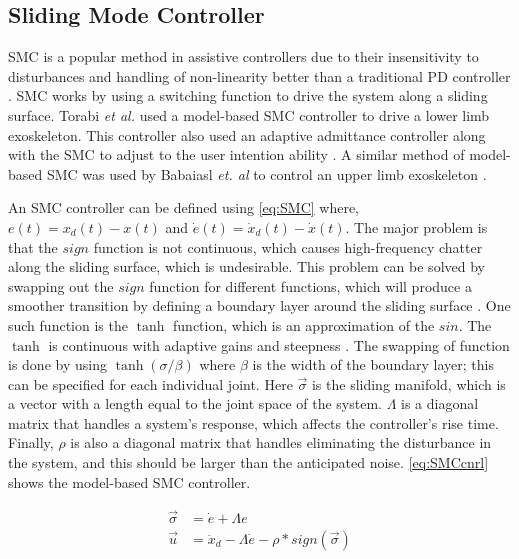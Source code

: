 \subsection{Sliding Mode Controller}

SMC is a popular method in assistive controllers due to their insensitivity to disturbances and handling of non-linearity better than a traditional PD controller \cite{nasir2010performance} \cite{sanngoen2020review} \cite{fischer-SMC}. SMC works by using a switching function to drive the system along a sliding surface. Torabi \textit{et al.} used a model-based SMC controller to drive a lower limb exoskeleton. This controller also used an adaptive admittance controller along with the SMC to adjust to the user intention ability \cite{torabi2018robust}. A similar method of model-based SMC was used by Babaiasl \textit{et. al} to control an upper limb exoskeleton \cite{babaiasl2015sliding}.


An SMC controller can be defined using \autoref{eq:SMC} where, $e(t) = x_d(t) - x(t)$ and $\dot{e}(t) = \dot{x}_d(t) - \dot{x}(t)$. The major problem is that the $sign$ function is not continuous, which causes high-frequency chatter along the sliding surface, which is undesirable. This problem can be solved by swapping out the $sign$  function for different functions, which will produce a smoother transition by defining a boundary layer around the sliding surface \cite{babaiasl2015sliding}. One such function is the $\tanh$ function, which is an approximation of the $sin$. The $\tanh$ is continuous with adaptive gains and steepness \cite{aghababa2012chattering}. The swapping of function is done by using $\tanh(\sigma / \beta)$ where $\beta$ is the width of the boundary layer; this can be specified for each individual joint. Here $\vec{\sigma}$ is the sliding manifold, which is a vector with a length equal to the joint space of the system. $\Lambda$ is a diagonal matrix that handles a system's response, which affects the controller's rise time. Finally, $\rho$ is also a diagonal matrix that handles eliminating the disturbance in the system, and this should be larger than the anticipated noise.  \autoref{eq:SMCcnrl} shows the model-based SMC controller.

\begin{equation}
   \begin{aligned} 
        \vec{\sigma} &=  \dot{e}  + \Lambda e \\
        \vec{u} &= \ddot{x}_d - \Lambda \dot{e} - \rho * sign(\vec{\sigma})
    \end{aligned}
    \label{eq:SMC}
\end{equation}






